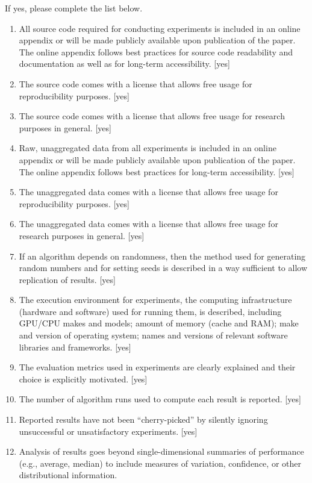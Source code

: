 \documentclass[manuscript, screen, review]{jair}
\begin{document}
If yes, please complete the list below.
\begin{enumerate}
    \item 
    All source code required for conducting experiments is included in an online appendix 
    or will be made publicly available upon publication of the paper.
    The online appendix follows best practices for source code readability and documentation as well as for long-term accessibility.
    [yes]
    \item The source code comes with a license that
    allows free usage for reproducibility purposes.
    [yes]
    \item The source code comes with a license that
    allows free usage for research purposes in general.
    [yes]
    \item 
    Raw, unaggregated data from all experiments is included in an online appendix 
    or will be made publicly available upon publication of the paper.
    The online appendix follows best practices for long-term accessibility.
    [yes]
    \item The unaggregated data comes with a license that
    allows free usage for reproducibility purposes.
    [yes]
    \item The unaggregated data comes with a license that
    allows free usage for research purposes in general.
    [yes]
    \item If an algorithm depends on randomness, then the method used for generating random numbers and for setting seeds is described in a way sufficient to allow replication of results. 
    [yes]
    \item The execution environment for experiments, the computing infrastructure (hardware and software) used for running them, is described, including GPU/CPU makes and models; amount of memory (cache and RAM); make and version of operating system; names and versions of relevant software libraries and frameworks. 
    [yes]
    \item 
    The evaluation metrics used in experiments are clearly explained and their choice is explicitly motivated. 
    [yes]
    \item 
    The number of algorithm runs used to compute each result is reported. 
    [yes]
    \item 
    Reported results have not been ``cherry-picked'' by silently ignoring unsuccessful or unsatisfactory experiments. 
    [yes]
    \item 
    Analysis of results goes beyond single-dimensional summaries of performance (e.g., average, median) to include measures of variation, confidence, or other distributional information. 

\end{enumerate}
\end{document}
